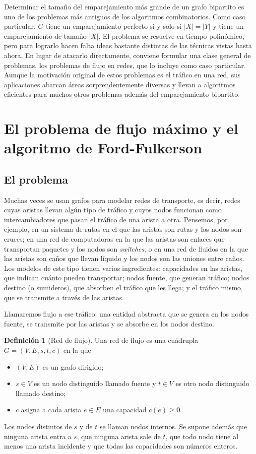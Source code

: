 \documentclass[12pt, spanish, oneside, openany]{book}
\theoremstyle{uprightplain}
\theoremstyle{definition}
\newtheorem{definicion}[teorema]{Definición}
\theoremstyle{remark}
\theoremstyle{definition}
\begin{document}
Determinar el tamaño del emparejamiento más grande de un grafo bipartito es uno de los problemas más antiguos de los algoritmos combinatorios. Como caso particular, $G$ tiene un emparejamiento perfecto si y solo si $|X|=|Y|$ y tiene un emparejamiento de tamaño $|X|$. El problema se resuelve en tiempo polinómico, pero para lograrlo hacen falta ideas bastante distintas de las técnicas vistas hasta ahora. En lugar de atacarlo directamente, conviene formular una clase general de problemas, los problemas de flujo en redes, que lo incluye como caso particular. Aunque la motivación original de estos problemas es el tráfico en una red, sus aplicaciones abarcan áreas sorprendentemente diversas y llevan a algoritmos eficientes para muchos otros problemas además del emparejamiento bipartito.


\section{El problema de flujo máximo y el algoritmo de Ford-Fulkerson}
\label{sec:flujo-ff}

\subsection{El problema}

Muchas veces se usan grafos para modelar redes de transporte, es decir, redes cuyas aristas llevan algún tipo de tráfico y cuyos nodos funcionan como intercambiadores que pasan el tráfico de una arista a otra. Pensemos, por ejemplo, en un sistema de rutas en el que las aristas son rutas y los nodos son cruces; en una red de computadoras en la que las aristas son enlaces que transportan paquetes y los nodos son \emph{switches}; o en una red de fluidos en la que las aristas son caños que llevan líquido y los nodos son las uniones entre caños. Los modelos de este tipo tienen varios ingredientes: capacidades en las aristas, que indican cuánto pueden transportar; nodos fuente, que generan tráfico; nodos destino (o sumideros), que absorben el tráfico que les llega; y el tráfico mismo, que se transmite a través de las aristas.

Llamaremos flujo a ese tráfico: una entidad abstracta que se genera en los nodos fuente, se transmite por las aristas y se absorbe en los nodos destino.

\begin{definicion}[Red de flujo]
\label{def:red-flujo}
Una red de flujo es una cuádrupla $G=(V,E,s,t,c)$ en la que
\begin{itemize}
    \item $(V,E)$ es un grafo dirigido;
    \item $s\in V$ es un nodo distinguido llamado fuente y $t\in V$ es otro nodo distinguido llamado destino;
    \item $c$ asigna a cada arista $e\in E$ una capacidad $c(e)\ge 0$.
\end{itemize}
Los nodos distintos de $s$ y de $t$ se llaman nodos internos. Se supone además que ninguna arista entra a $s$, que ninguna arista sale de $t$, que todo nodo tiene al menos una arista incidente y que todas las capacidades son números enteros.
\end{definicion}
\end{document}
